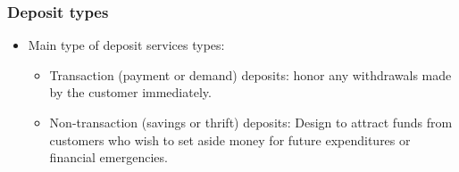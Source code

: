 \subsubsection{Deposit types}
\begin{itemize}
\item Main type of deposit services types:
    \begin{itemize}
    \item Transaction (payment or demand) deposits: honor any withdrawals made by the customer immediately.
    \item Non-transaction (savings or thrift) deposits: Design to attract funds from customers who wish to set aside money for future expenditures or financial emergencies.
    \end{itemize}
\end{itemize}




